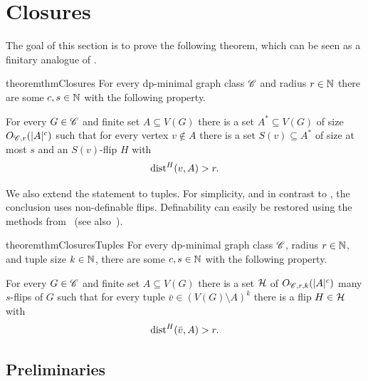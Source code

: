 \section{Closures}\label{sec:closures}
The goal of this section is to prove the following theorem, which can be seen as a finitary analogue of \cite[Theorem~7.1 in the full version]{flippers}.

\begin{restatable}{theorem}{thmClosures}\label{thm:closures}
For every dp-minimal graph class $\mathscr C$ and radius $r\in\mathbb N$ there are some $c,s\in\mathbb N$ with the following property.

\smallskip\noindent
For every $G \in \mathscr C$ and finite set $A \subseteq V(G)$ there is a set $A^*\subseteq V(G)$ of size $O_{\mathscr C,r}(|A|^c)$ such that for every vertex $v \notin A$ there is a set $S(v)\subseteq A^*$ of size at most $s$
and an $S(v)$-flip $H$ with
\[
    \mathrm{dist}^H(v,A) > r.
\]
\end{restatable}



We also extend the statement to tuples.
For simplicity, and in contrast to , the conclusion uses non-definable flips. 
Definability can easily be restored using the methods from~\cite{DBLP:conf/lics/BonnetDGKMST22} (see also~\cite{bonnet2025separability-icalp}).

\begin{restatable}{theorem}{thmClosuresTuples}\label{thm:closuresTuples}
For every dp-minimal graph class $\mathscr C$, radius $r\in\mathbb N$, and tuple size $k \in \mathbb N$, there are some $c,s\in\mathbb N$ with the following property.

\smallskip\noindent
For every $G \in \mathscr C$ and finite set $A \subseteq V(G)$ there is a set $\mathcal H$ of $O_{\mathscr C,r,k}(|A|^c)$ many $s$-flips of $G$ such that for every tuple $\bar v \in (V(G) \setminus A)^k$ there is a flip $H \in \mathcal H$ with
\[
    \mathrm{dist}^H(\bar v,A) > r.
\]
\end{restatable}

\subsection{Preliminaries}

